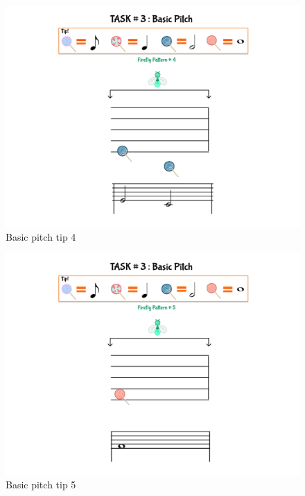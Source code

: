\begin{figure}[H]
    \centering
    \includegraphics[width=12cm]{figures/NewFigures/BasicPitchTip4.png}
    \caption{Basic pitch tip 4}
    \label{fig:BasicPitchTip4}
\end{figure}

\begin{figure}[H]
    \centering
    \includegraphics[width=12cm]{figures/NewFigures/BasicPitchTip5.png}
    \caption{Basic pitch tip 5}
    \label{fig:BasicPitchTip5}
\end{figure}

